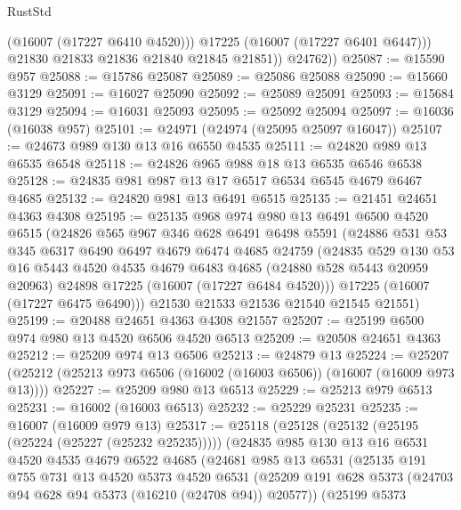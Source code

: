 \begin{lexlean}{RustStd}
\begin{coremodule}
                (@16007 (@17227 @6410 @4520)))
              @17225
              (@16007 (@17227 @6401 @6447)))
            @21830
            @21833
            @21836
            @21840
            @21845
            @21851))
        @24762))
@25087 := @15590 @957
@25088 := @15786 @25087
@25089 := @25086 @25088
@25090 := @15660 @3129
@25091 := @16027 @25090
@25092 := @25089 @25091
@25093 := @15684 @3129
@25094 := @16031 @25093
@25095 := @25092 @25094
@25097 := @16036 (@16038 @957)
@25101 := @24971 (@24974 (@25095 @25097 @16047))
@25107 := @24673 @989 @130 @13 @16 @6550 @4535
@25111 := @24820 @989 @13 @6535 @6548
@25118 := @24826 @965 @988 @18 @13 @6535 @6546 @6538
@25128 := @24835 @981 @987 @13 @17 @6517 @6534 @6545 @4679 @6467 @4685
@25132 := @24820 @981 @13 @6491 @6515
@25135 := @21451 @24651 @4363 @4308
@25195 := @25135
    @968
    @974
    @980
    @13
    @6491
    @6500
    @4520
    @6515
    (@24826
      @565
      @967
      @346
      @628
      @6491
      @6498
      @5591
      (@24886
        @531
        @53
        @345
        @6317
        @6490
        @6497
        @4679
        @6474
        @4685
        @24759
        (@24835
          @529
          @130
          @53
          @16
          @5443
          @4520
          @4535
          @4679
          @6483
          @4685
          (@24880 @528 @5443 @20959 @20963)
          @24898
          @17225
          (@16007 (@17227 @6484 @4520)))
        @17225
        (@16007 (@17227 @6475 @6490)))
      @21530
      @21533
      @21536
      @21540
      @21545
      @21551)
@25199 := @20488 @24651 @4363 @4308 @21557
@25207 := @25199 @6500 @974 @980 @13 @4520 @6506 @4520 @6513
@25209 := @20508 @24651 @4363
@25212 := @25209 @974 @13 @6506
@25213 := @24879 @13
@25224 := @25207 (@25212 (@25213 @973 @6506 (@16002 (@16003 @6506)) (@16007 (@16009 @973 @13))))
@25227 := @25209 @980 @13 @6513
@25229 := @25213 @979 @6513
@25231 := @16002 (@16003 @6513)
@25232 := @25229 @25231
@25235 := @16007 (@16009 @979 @13)
@25317 := @25118
    (@25128
      (@25132 (@25195 (@25224 (@25227 (@25232 @25235)))))
      (@24835
        @985
        @130
        @13
        @16
        @6531
        @4520
        @4535
        @4679
        @6522
        @4685
        (@24681
          @985
          @13
          @6531
          (@25135
            @191
            @755
            @731
            @13
            @4520
            @5373
            @4520
            @6531
            (@25209 @191 @628 @5373 (@24703 @94 @628 @94 @5373 (@16210 (@24708 @94)) @20577))
            (@25199
              @5373

\end{coremodule}
\end{lexlean}
